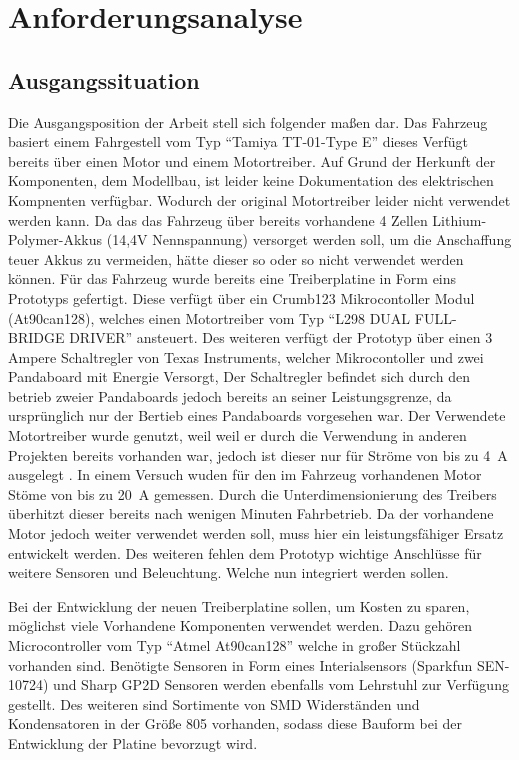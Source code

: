 
\chapter{Anforderungsanalyse}

\section{Ausgangssituation}
Die Ausgangsposition der Arbeit stell sich folgender maßen dar. Das Fahrzeug basiert einem Fahrgestell vom Typ ``Tamiya TT-01-Type E''
dieses Verfügt bereits über einen Motor und einem Motortreiber. Auf Grund der Herkunft der Komponenten, dem Modellbau, ist leider keine
Dokumentation des elektrischen Kompnenten verfügbar. Wodurch der original Motortreiber leider nicht verwendet werden kann.
Da das das Fahrzeug über bereits vorhandene 4 Zellen Lithium-Polymer-Akkus (14,4V Nennspannung) versorget werden soll, um die Anschaffung teuer Akkus zu vermeiden,
hätte dieser so oder so nicht verwendet werden können. Für das Fahrzeug wurde bereits eine Treiberplatine in Form eins Prototyps gefertigt.
Diese verfügt über ein Crumb123 Mikrocontoller Modul (At90can128), welches einen Motortreiber vom Typ ``L298 DUAL FULL-BRIDGE DRIVER'' ansteuert.
Des weiteren verfügt der Prototyp über einen 3 Ampere Schaltregler von Texas Instruments, welcher Mikrocontoller und zwei Pandaboard mit Energie Versorgt, 
Der Schaltregler befindet sich durch den betrieb zweier Pandaboards jedoch bereits an seiner Leistungsgrenze, da ursprünglich nur der Bertieb eines Pandaboards
vorgesehen war. Der Verwendete Motortreiber wurde genutzt, weil weil er durch die Verwendung in anderen Projekten bereits vorhanden war, jedoch ist dieser 
nur für Ströme von bis zu \SI{4}{\A} ausgelegt \cite{L298}. In einem Versuch wuden für den im Fahrzeug vorhandenen Motor Stöme von bis zu \SI{20}{\A} gemessen. 
Durch die Unterdimensionierung des Treibers überhitzt dieser bereits nach wenigen Minuten Fahrbetrieb.
Da der vorhandene Motor jedoch weiter verwendet werden soll, muss hier ein leistungsfähiger Ersatz 
entwickelt werden. Des weiteren fehlen dem Prototyp wichtige Anschlüsse für weitere Sensoren und Beleuchtung. Welche nun integriert werden sollen. 

Bei der Entwicklung der neuen Treiberplatine sollen, um Kosten zu sparen, möglichst viele Vorhandene Komponenten verwendet werden. Dazu gehören
Microcontroller vom Typ ``Atmel At90can128'' welche in großer Stückzahl vorhanden sind. Benötigte Sensoren in Form eines Interialsensors (Sparkfun SEN-10724)
und Sharp GP2D Sensoren werden ebenfalls vom Lehrstuhl zur Verfügung gestellt. Des weiteren sind Sortimente von SMD Widerständen und
Kondensatoren in der Größe 805 vorhanden, sodass diese Bauform bei der Entwicklung der Platine bevorzugt wird.

